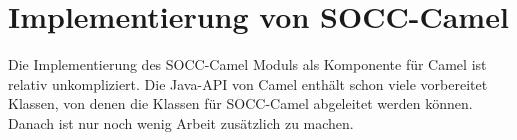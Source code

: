



\section{Implementierung von SOCC-Camel} %
\label{sec:implementierung_von_socc_camel}

Die Implementierung des SOCC-Camel Moduls als Komponente für Camel ist relativ unkompliziert. Die Java-API von Camel enthält schon viele vorbereitet Klassen, von denen die Klassen für SOCC-Camel abgeleitet werden können. Danach ist nur noch wenig Arbeit zusätzlich zu machen.

